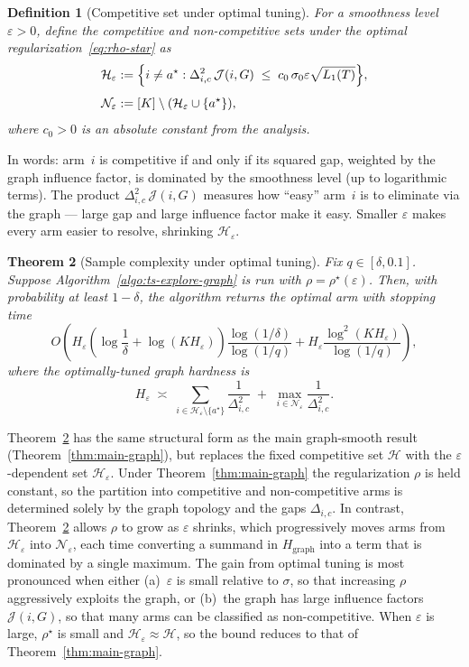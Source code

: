 \documentclass{article}
\newtheorem{theorem}{Theorem}
\newtheorem{definition}[theorem]{Definition}
\begin{document}
\begin{definition}[Competitive set under optimal tuning]
\label{def:comp-eps}
For a smoothness level $\varepsilon>0$, define the competitive and
non-competitive sets under the optimal regularization~\eqref{eq:rho-star} as
\begin{align*}
\mathcal H_\varepsilon
&:=
\Bigl\{i\neq a^\star :
\Delta_{i,c}^2\,\mathcal J(i,G)
\;\le\;
c_0\,\sigma_0\varepsilon\sqrt{L_1(T)}
\Bigr\},\\[4pt]
\mathcal N_\varepsilon
&:=
[K]\setminus(\mathcal H_\varepsilon\cup\{a^\star\}),
\end{align*}
where $c_0>0$ is an absolute constant from the analysis.
\end{definition}

In words: arm~$i$ is competitive if and only if its squared gap, weighted by
the graph influence factor, is dominated by the smoothness level (up to
logarithmic terms). The product $\Delta_{i,c}^2\,\mathcal J(i,G)$ measures how
``easy'' arm~$i$ is to eliminate via the graph --- large gap and large influence
factor make it easy. Smaller $\varepsilon$ makes every arm easier to resolve,
shrinking $\mathcal H_\varepsilon$.

\begin{theorem}[Sample complexity under optimal tuning]
\label{thm:main-mis}
Fix $q\in[\delta,0.1]$. Suppose
Algorithm~\ref{algo:ts-explore-graph} is run with
$\rho=\rho^\star(\varepsilon)$. Then, with probability at least $1-\delta$, the
algorithm returns the optimal arm with stopping time
\[
O\!\left(
H_\varepsilon
\left(\log\frac1\delta+\log(KH_\varepsilon)\right)
\frac{\log(1/\delta)}{\log(1/q)}
+
H_\varepsilon
\frac{\log^2(KH_\varepsilon)}{\log(1/q)}
\right),
\]
where the optimally-tuned graph hardness is
\[
H_\varepsilon
\;\asymp\;
\sum_{i\in\mathcal H_\varepsilon\setminus\{a^\star\}}
\frac{1}{\Delta_{i,c}^2}
\;+\;
\max_{i\in\mathcal N_\varepsilon}
\frac{1}{\Delta_{i,c}^2}.
\]
\end{theorem}


Theorem~\ref{thm:main-mis} has the same structural form as the main graph-smooth
result (Theorem~\ref{thm:main-graph}), but replaces the fixed competitive set
$\mathcal H$ with the $\varepsilon$-dependent set $\mathcal H_\varepsilon$.
Under Theorem~\ref{thm:main-graph} the regularization $\rho$ is held constant,
so the partition into competitive and non-competitive arms is determined solely
by the graph topology and the gaps $\Delta_{i,c}$. In contrast,
Theorem~\ref{thm:main-mis} allows $\rho$ to grow as $\varepsilon$ shrinks, which
progressively moves arms from $\mathcal H_\varepsilon$ into $\mathcal
N_\varepsilon$, each time converting a summand in $H_{\mathrm{graph}}$ into a
term that is dominated by a single maximum. The gain from optimal tuning is most
pronounced when either (a)~$\varepsilon$ is small relative to $\sigma$, so that
increasing $\rho$ aggressively exploits the graph, or (b)~the graph has large
influence factors $\mathcal J(i,G)$, so that many arms can be classified as
non-competitive. When $\varepsilon$ is large, $\rho^\star$ is small and
$\mathcal H_\varepsilon\approx\mathcal H$, so the bound reduces to that of
Theorem~\ref{thm:main-graph}.
\end{document}

